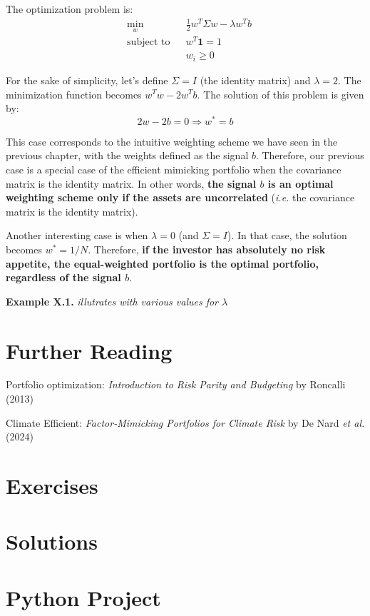 The optimization problem is:
\begin{equation}
    \begin{aligned}
        & \underset{w}{\min}
        & &  \frac{1}{2} w^T \Sigma w - \lambda w^T b \\
        & \text{subject to}
        & & w^T \mathbf{1} = 1 \\
        & & & w_i \geq 0
    \end{aligned}
\end{equation}

For the sake of simplicity, let's define $\Sigma = I$ (the identity matrix)
and $\lambda = 2$.
The minimization function becomes $w^T w - 2 w^T b$. The solution of this problem is given by:
\begin{equation}
    2w - 2b = 0 \Rightarrow w^* = b
\end{equation}

This case corresponds to the intuitive weighting scheme 
we have seen in the previous chapter, with the weights defined 
as the signal $b$. Therefore, our previous case 
is a special case of the efficient mimicking portfolio 
when the covariance matrix is the identity matrix. 
In other words, \textbf{the signal $b$
is an optimal weighting scheme only if the assets are
uncorrelated} (\textit{i.e.} the covariance matrix is the identity matrix).

Another interesting case is when $\lambda = 0$ (and $\Sigma = I$).
In that case, the solution becomes $w^* = 1/N$. Therefore, \textbf{if 
the investor has absolutely no risk appetite, 
the equal-weighted portfolio is the optimal portfolio, 
regardless of the signal $b$}.


\begin{examplebox}
    \textbf{Example X.1.}    
    \textit{illutrates with various values for 
    $\lambda$}
\end{examplebox}

\section{Further Reading}

Portfolio optimization:
\textit{Introduction to Risk Parity and Budgeting} 
by Roncalli (2013) \cite{roncalli2013introduction}

Climate Efficient: \textit{Factor-Mimicking Portfolios for Climate Risk}
by De Nard \textit{et al.} (2024) \cite{de2024factor}

\section{Exercises}

\section{Solutions}

\section{Python Project}